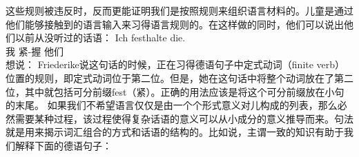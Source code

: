 这些规则被违反时，反而更能证明我们是按照规则来组织语言材料的。儿童是通过他们能够接触到的语言输入来习得语言规则的。在这样做的同时，他们可以说出他们以前从没听过的话语：
\ea
\settowidth{}
\gll Ich festhalte die. \\
     我 紧-握 他们\\
\glt 想说：
\z
Friederike说这句话的时候，正在习得德语句子中定式动词（finite verb）位置的规则，即定式动词位于第二位。但是，她在这句话中将整个动词放在了第二位，其中就包括可分前缀fest（紧）。正确的用法应该是将这个可分前缀放在小句的末尾。
如果我们不希望语言仅仅是由一个个形式意义对儿构成的列表，那么必然需要某种过程，该过程使得复杂话语的意义可以从小成分的意义推导而来。句法就是用来揭示词汇组合的方式和话语的结构的。比如说，主谓一致的知识有助于我们解释下面的德语句子：

